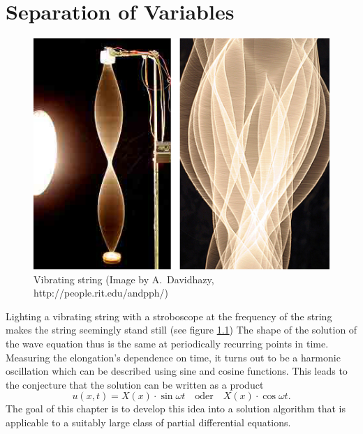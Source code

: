 %
%
%
\rhead{}
\chapter{Separation of Variables\label{chapter:separation}}
\begin{figure}
\begin{center}
\includegraphics[width=0.8\hsize]{../common/graphics/stringvibrlarge-10-06-06.jpg}
\end{center}
\caption{
Vibrating string
(Image by A.~Davidhazy, http://people.rit.edu/andpph/)
\label{separation:schwingendesaite}}
\end{figure}
Lighting a vibrating string with a stroboscope at the frequency of the
string makes the string seemingly stand still (see figure
\ref{separation:schwingendesaite})
The shape of the solution of the wave equation thus is the same
at periodically recurring points in time.
Measuring the elongation's dependence on time, it turns out to be
a harmonic oscillation which can be described using sine and cosine
functions.
This leads to the conjecture that the solution can be written as 
a product
\[
u(x,t)=X(x)\cdot\sin\omega t\quad\text{oder}\quad X(x)\cdot\cos\omega t.
\]
The goal of this chapter is to develop this idea into a solution
algorithm that is applicable to a suitably large class of partial
differential equations.









